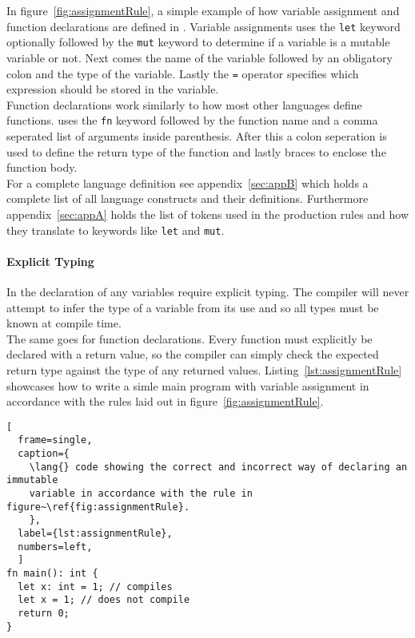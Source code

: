In figure~\ref{fig:assignmentRule}, a simple example of how
variable assignment and function declarations are defined in \lang. Variable
assignments uses the
\texttt{let} keyword optionally followed by the \texttt{mut} keyword to determine if
a variable is a mutable variable or not. Next comes the name of the variable
followed by an obligatory colon and the type of the variable. Lastly the
\texttt{=} operator specifies which expression should be stored in the variable. \\

Function declarations work similarly to how most other languages define functions.
\lang{} uses the \texttt{fn} keyword followed by the function name and a comma
seperated list of arguments inside parenthesis. After this a colon
seperation is used to define the return type of the function and lastly braces to enclose
the function body. \\

For a complete language definition see appendix~\ref{sec:appB} which holds a
complete list of all language constructs and their definitions. Furthermore
appendix~\ref{sec:appA} holds the list of tokens used in the production rules and how
they translate to keywords like \texttt{let} and \texttt{mut}.


\paragraph{Explicit Typing} \hfill
\vspace{0.1em}

In \lang{} the declaration of any variables require explicit typing. The compiler
will never attempt to infer the type of a variable from its use and so all types
must be known at compile time.\\

The same goes for function declarations. Every function must explicitly be declared
with a return value, so the compiler can simply check the expected return type
against the type of any returned values. Listing~\ref{lst:assignmentRule} showcases
how to write a simle main program with variable assignment in accordance with the
rules laid out in figure~\ref{fig:assignmentRule}.

\begin{lstlisting}[
  frame=single,
  caption={
    \lang{} code showing the correct and incorrect way of declaring an immutable
    variable in accordance with the rule in figure~\ref{fig:assignmentRule}.
    },
  label={lst:assignmentRule},
  numbers=left,
  ]
fn main(): int {
  let x: int = 1; // compiles
  let x = 1; // does not compile
  return 0;
}
\end{lstlisting}

